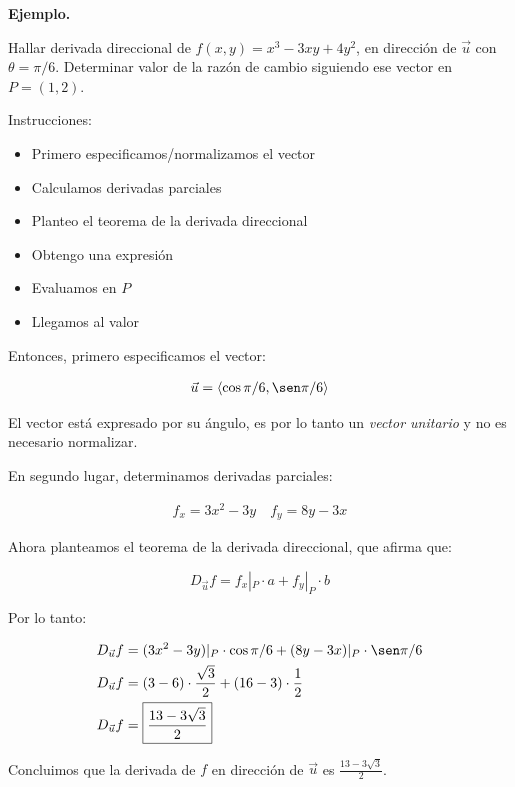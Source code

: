 \textbf{Ejemplo.}

Hallar derivada direccional de \(f(x,y) = x^{3} - 3xy + 4y^{2}\),
en dirección de \(\vec{u}\) con \(\theta = \pi/6\).
Determinar valor de la razón de cambio siguiendo ese vector en \(P = (1,2)\).

Instrucciones:
\begin{itemize}
    \item Primero especificamos/normalizamos el vector
    \item Calculamos derivadas parciales 
    \item Planteo el teorema de la derivada direccional 
    \item Obtengo una expresión
    \item Evaluamos en \(P\)
    \item Llegamos al valor
\end{itemize}

Entonces,
primero especificamos el vector:

\begin{align*}
    \vec{u} = \langle\cos\pi/6,\sen\pi/6 \rangle
\end{align*}

El vector está expresado por su ángulo,
es por lo tanto un \textit{vector unitario} y no es necesario normalizar.

En segundo lugar,
determinamos derivadas parciales:

\begin{align*}
    f_x = 3x^{2} - 3y \quad f_y = 8y - 3x
\end{align*}

Ahora planteamos el teorema de la derivada direccional,
que afirma que:

\begin{equation*}
    D_{\vec{u}}f = f_x|_P\cdot a + f_y|_P\cdot b
\end{equation*}

Por lo tanto:

\begin{align*}
    D_{\vec{u}}f & = (3x^{2} - 3y)|_P\cdot \cos\pi/6 
    + (8y - 3x)|_P\cdot \sen\pi/6 \\
    D_{\vec{u}}f & = (3 - 6) \cdot \frac{\sqrt{3}}{2} 
    + (16 - 3) \cdot \frac{1}{2} \\
    D_{\vec{u}}f & = \boxed{\frac{13 - 3\sqrt{3}}{2}}
\end{align*}

Concluimos que la derivada de \(f\) en dirección de \(\vec{u}\) es 
\(\frac{13 - 3\sqrt{3}}{2}\).

